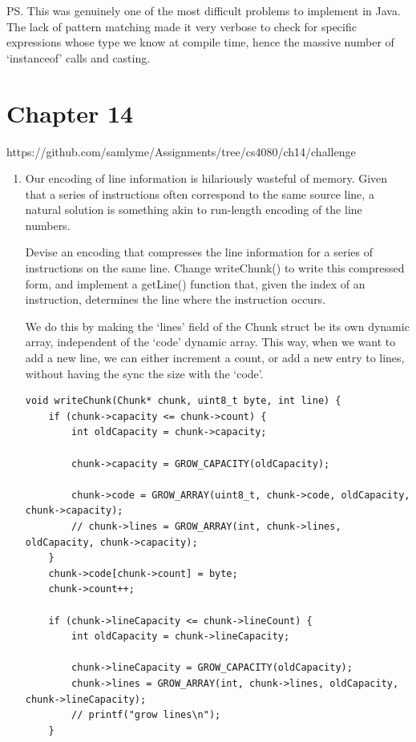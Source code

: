 \documentclass{article}
\begin{document}
\begin{enumerate}
{        PS. This was genuinely one of the most difficult problems to implement in 
        Java. The lack of pattern matching made it very verbose to check for 
        specific expressions whose type we know at compile time, hence the massive 
        number of `instanceof' calls and casting.
    }
\end{enumerate}

\section*{Chapter 14}
https://github.com/samlyme/Assignments/tree/cs4080/ch14/challenge

\begin{enumerate}
    \item {
        Our encoding of line information is hilariously wasteful of memory. Given that a series of instructions often correspond to the same source line, a natural solution is something akin to run-length encoding of the line numbers.

        Devise an encoding that compresses the line information for a series of instructions on the same line. Change writeChunk() to write this compressed form, and implement a getLine() function that, given the index of an instruction, determines the line where the instruction occurs.

        We do this by making the `lines' field of the Chunk struct be its own
        dynamic array, independent of the `code' dynamic array. This way, when 
        we want to add a new line, we can either increment a count, or add a new 
        entry to lines, without having the sync the size with the `code'.

        \begin{verbatim}
void writeChunk(Chunk* chunk, uint8_t byte, int line) {
    if (chunk->capacity <= chunk->count) {
        int oldCapacity = chunk->capacity;

        chunk->capacity = GROW_CAPACITY(oldCapacity);

        chunk->code = GROW_ARRAY(uint8_t, chunk->code, oldCapacity, chunk->capacity);
        // chunk->lines = GROW_ARRAY(int, chunk->lines, oldCapacity, chunk->capacity);
    }
    chunk->code[chunk->count] = byte;
    chunk->count++;

    if (chunk->lineCapacity <= chunk->lineCount) {
        int oldCapacity = chunk->lineCapacity;

        chunk->lineCapacity = GROW_CAPACITY(oldCapacity);
        chunk->lines = GROW_ARRAY(int, chunk->lines, oldCapacity, chunk->lineCapacity);
        // printf("grow lines\n");
    }


\end{verbatim}}
\end{enumerate}
\end{document}

